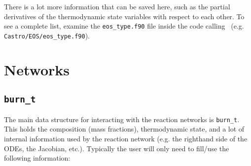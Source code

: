 There is a lot more information that can be saved here, such as the
partial derivatives of the thermodynamic state variables with respect
to each other. To see a complete list, examine the {\tt eos\_type.f90}
file inside the code calling \microphysics\ (e.g. {\tt
  Castro/EOS/eos\_type.f90}).


\section{Networks}

\subsection{{\tt burn\_t}}

The main data structure for interacting with the reaction networks is
{\tt burn\_t}.  This holds the composition (mass fractions),
thermodynamic state, and a lot of internal information used by the
reaction network (e.g. the righthand side of the ODEs, the Jacobian,
etc.).  Typically the user will only need to fill/use the following
information:
